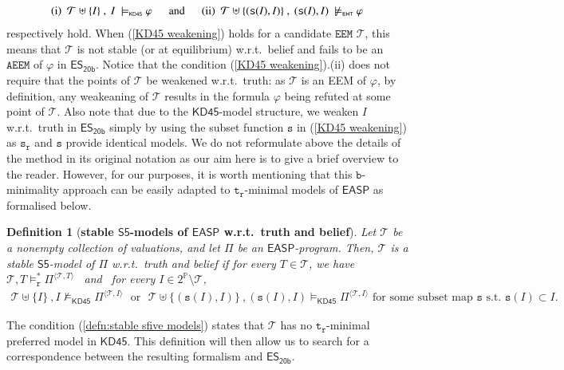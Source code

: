 \documentclass[submission,copyright,creativecommons]{eptcs}
\renewcommand{\phi}  { \varphi }
\newcommand{\tuple}[1]  { \langle #1 \rangle }
\newcommand{\Prop}  { \mathbb{P} }
\newcommand{\set}[1]  { \{ #1 \} }
\newcommand{\logic}[1]  { \ensuremath{\mathsf{#1}} }
\newcommand{\sfive}  { \logic{S5} }
\newcommand{\KD}  { \logic{KD45} }
\newcommand{\EHT}  { \logic{EHT} }
\newcommand{\EASP}  { \logic{EASP} }
\newcommand{\epispec}  { \Pi }
\newcommand{\ESyirmib}  { \logic{ES_{\scriptscriptstyle{20b}} } }
\newcommand{\weak}  { \texttt{s} }
\newcommand{\relational}  { \texttt{r} }
\newcommand{\weakrelational}  { \weak_{\!\relational} }
\newcommand{\trelational}  { \texttt{t}_{\!\relational} }
\newcommand{\EEM} { \texttt{EEM} }
\newcommand{\AEEM}  { \texttt{AEEM} }
\newcommand{\notEhtmodels}  { \not\models_{\scriptscriptstyle \EHT} }
\newcommand{\starmodelsrelational}  { \models^*_{\!\relational} }
\newcommand{\KDmodels}  { \models_{\scriptscriptstyle{\KD}} }
\newtheorem{definition}{Definition}
\begin{document}
%
\begin{align} \label{KD45 weakening}
\text{(i) }~ \mathcal T \uplus \set{I} \ , \ I \ \KDmodels \phi \text{ \, \, \, and \, \, \, } 
\text{(ii) }~ \mathcal T \uplus \set{(\weak(I), I)} \ , \ (\weak(I), I) \ \notEhtmodels \phi
\end{align}
%
respectively hold.
When (\ref{KD45 weakening}) holds for a candidate $\EEM$ $\mathcal T$, 
this means that
$\mathcal T$ is not stable (or at equilibrium) w.r.t.\ 
belief and fails to be an $\AEEM$ of $\phi$ in $\ESyirmib$.
Notice that the condition (\ref{KD45 weakening}).(ii) does not require that 
the points of $\mathcal T$ be weakened w.r.t.\ truth: 
as $\mathcal T$ is an EEM of $\phi$, by definition, 
any weakeaning of $\mathcal T$ results in the formula $\phi$ being refuted
at some point of $\mathcal T$. Also note that due to the $\KD$-model structure, 
we weaken $I$ w.r.t.\ truth in $\ESyirmib$
simply by using the subset function $\weak$ in (\ref{KD45 weakening}) as $\weakrelational$ and $\weak$
provide identical models. We  do not 
reformulate above the details of the method in its original notation 
as our aim here is to give
a brief overview to the reader. However, for our purposes, it is worth mentioning that 
this $\texttt{b}$-minimality approach can be easily adapted to $\trelational$-minimal 
models of $\EASP$ as formalised below. 
%
\begin{definition} [\textbf{stable $\sfive$-models of $\EASP$ w.r.t.\ truth and belief}]
\normalfont Let $\mathcal T$ be a nonempty collection of valuations, and
let $\epispec$ be an $\EASP$-program. Then, $\mathcal T$ is a 
\emph{stable $\sfive$-model} of $\epispec$ w.r.t.\ truth and belief 
if for every $T \in \mathcal T$, we have
$\mathcal T, T \starmodelsrelational \epispec^{\tuple{\mathcal T, T}}$  \ and \
for every $I \in 2^{\Prop} \setminus \mathcal T$,
%
\begin{align} \label{defn:stable sfive models}
\mathcal T \uplus \set I \ , I \not \KDmodels \epispec^{\tuple{\mathcal T, I}} \text{ ~or~ }
\mathcal T \uplus  \set{(\weak(I), I)}\ , (\weak(I),I) \KDmodels \epispec^{\tuple{\mathcal T, I}}
\text{ for some subset map }  \weak  \text{ s.t.\ } \weak(I) \subset I. 
\end{align}
%
\end{definition}

The condition (\ref{defn:stable sfive models}) states that $\mathcal T$ has no $\trelational$-minimal preferred model in $\KD$. 
This definition will then allow us to search for a correspondence 
between the resulting formalism and $\ESyirmib$.
\end{document}
